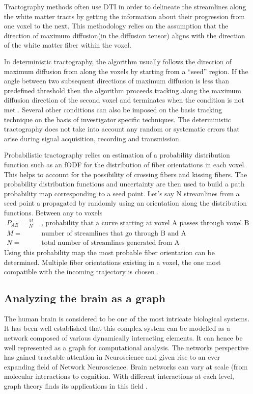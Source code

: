 \documentclass[msthesis.tex]{subfiles}
\begin{document}
Tractography methods often use DTI in order to delineate the streamlines along the white matter tracts by getting the information about their progression from one voxel to the next. This methodology relies on the assumption that the direction of maximum diffusion(in the diffusion tensor) aligns with the direction of the white matter fiber within the voxel. 

In deterministic tractography, the algorithm usually follows the direction of maximum diffusion from along the voxels by starting from a “seed” region. If the angle between two subsequent directions of maximum diffusion is less than predefined threshold then the algorithm proceeds tracking along the maximum diffusion direction of the second voxel and terminates when the condition is not met \cite{}. Several other conditions can also be imposed on the basis tracking technique on the basis of investigator specific techniques. The deterministic tractography does not take into account any random or systematic errors that arise during signal acquisition, recording and transmission.

Probabilistic tractography relies on estimation of a probability distribution function such as an fODF for the distribution of fiber orientations in each voxel. This helps to account for the possibility of crossing fibers and kissing fibers. The probability distribution functions and uncertainty are then used to build a path probability map corresponding to a seed point. Let's say N streamlines from a seed point a propagated by randomly using an orientation along the distribution functions. Between any to voxels 
\begin{align*}
P_{AB}= \frac{M}{N} & \textrm{ , probability that a curve starting at voxel A passes through voxel B} \\
M = & \textrm{ number of streamlines that go through B and A} \\
N = &\textrm{ total number of streamlines generated from A}
\end{align*}
Using this probability map the most probable fiber orientation can be determined. Multiple fiber orientations existing in a voxel, the one most compatible with the incoming trajectory is chosen \citep{behrens2003non}.
\subsection{Analyzing the brain as a graph}
\label{sec:braingraph}
The human brain is considered to be one of the most intricate biological systems. It has been well established that this complex system can be modelled as a network composed of various dynamically interacting elements. It can hence be well represented as a graph for computational analysis. The networks perspective has gained tractable attention in Neuroscience and given rise to an ever expanding field of Network Neuroscience. Brain networks can vary at scale (from molecular interactions to cognition. With different interactions at each level, graph theory finds its applications in this field \cite{sporns2018graph}. 
\end{document}
